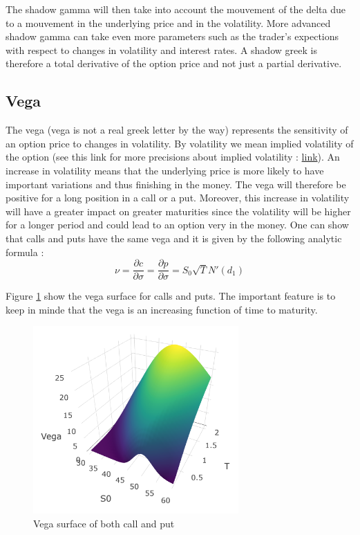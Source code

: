 \documentclass[hidelinks]{article}
\begin{document}
    The shadow gamma will then take into account the mouvement of the delta due to a mouvement in the underlying price and in the volatility. More advanced shadow gamma can take even more parameters such as the trader's expections with respect to changes in volatility and interest rates.
    A shadow greek is therefore a total derivative of the option price and not just a partial derivative.
    \newpage
    \subsection{Vega}
    
    The vega (vega is not a real greek letter by the way) represents the sensitivity of an option price to changes in volatility. By volatility we mean implied volatility of the option (see this link for more precisions about implied volatility : \href{https://www.investopedia.com/terms/i/iv.asp}{link}). An increase in volatility means that the underlying price is more likely to have important variations and thus finishing in the money. The vega will therefore be positive for a long position in a call or a put. Moreover, this increase in volatility will have a greater impact on greater maturities since the volatility will be higher for a longer period and could lead to an option very in the money. One can show that calls and puts have the same vega and it is given by the following analytic formula :
    $$\nu =\frac{\partial c}{\partial \sigma} =\frac{\partial p}{\partial \sigma}= S_0 \sqrt{T} N'(d_1)$$
    
    Figure \ref{fig:vega} show the vega surface for calls and puts. The important feature is to keep in minde that the vega is an increasing function of time to maturity.
    \begin{figure}[!h]
	\centering
	\includegraphics[width=0.7\textwidth]{vega.png}
    \caption{Vega surface of both call and put}
    \label{fig:vega}
    \end{figure}
    
\end{document}
